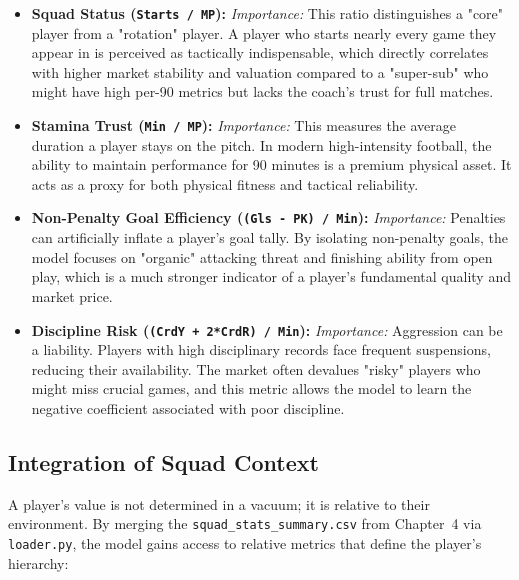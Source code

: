 \documentclass[a4paper,12pt]{report}
\begin{document}
\begin{itemize}
    \item \textbf{Squad Status (\texttt{Starts / MP}):} 
    \textit{Importance:} This ratio distinguishes a "core" player from a "rotation" player. A player who starts nearly every game they appear in is perceived as tactically indispensable, which directly correlates with higher market stability and valuation compared to a "super-sub" who might have high per-90 metrics but lacks the coach's trust for full matches.
    
    \item \textbf{Stamina Trust (\texttt{Min / MP}):} 
    \textit{Importance:} This measures the average duration a player stays on the pitch. In modern high-intensity football, the ability to maintain performance for 90 minutes is a premium physical asset. It acts as a proxy for both physical fitness and tactical reliability.
    
    \item \textbf{Non-Penalty Goal Efficiency (\texttt{(Gls - PK) / Min}):} 
    \textit{Importance:} Penalties can artificially inflate a player's goal tally. By isolating non-penalty goals, the model focuses on "organic" attacking threat and finishing ability from open play, which is a much stronger indicator of a player's fundamental quality and market price.
    
    \item \textbf{Discipline Risk (\texttt{(CrdY + 2*CrdR) / Min}):} 
    \textit{Importance:} Aggression can be a liability. Players with high disciplinary records face frequent suspensions, reducing their availability. The market often devalues "risky" players who might miss crucial games, and this metric allows the model to learn the negative coefficient associated with poor discipline.
\end{itemize}

\subsection{Integration of Squad Context}

A player's value is not determined in a vacuum; it is relative to their environment. By merging the \texttt{squad\_stats\_summary.csv} from Chapter~4 via \texttt{loader.py}, the model gains access to relative metrics that define the player's hierarchy:
\end{document}
